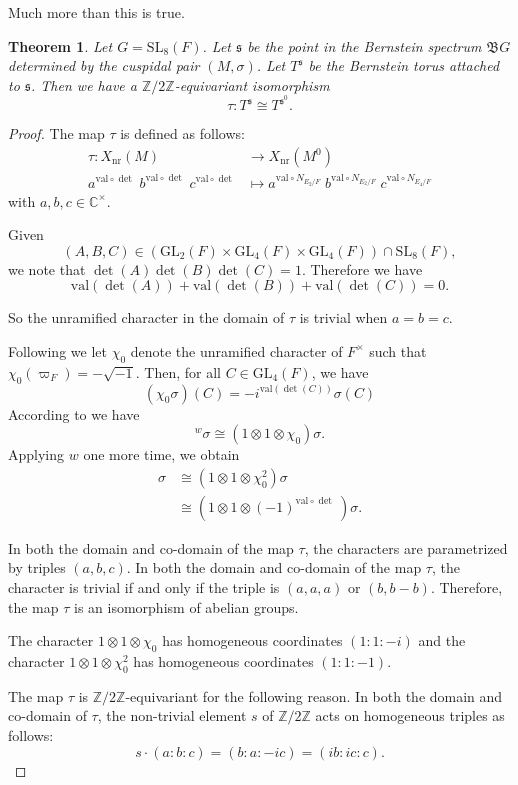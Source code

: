 \documentclass[11pt]{amsart}
\newtheorem{theorem}{Theorem}[section]
\theoremstyle{remark}
\theoremstyle{definition}
\def\fB{\mathfrak{B}}
\newcommand{\Z}{\mathbb{Z}}
\newcommand{\C}{\mathbb{C}}
\newcommand{\SL}{\mathrm{SL}}
\newcommand{\GL}{\mathrm{GL}}
\newcommand{\nr}{\mathrm{nr}}
\def\val{\mathrm{val}}
\newcommand{\fs}{\mathfrak{s}}
\def\fB{\mathfrak{B}}
\begin{document}
Much more than this is true.

\begin{theorem}  Let $G = \SL_8(F)$.  Let $\fs$ be the point in the Bernstein spectrum $\fB G$ determined by the cuspidal pair $(M,\sigma)$.   
  Let $T^{\fs}$ be the Bernstein torus attached to  $\fs$.   Then we have a $\Z/2\Z$-equivariant isomorphism
\[
 \tau :  T^{\fs} \cong T^{\fs^0}.   
\]
\end{theorem}
\begin{proof}   The map $\tau$ is defined as follows:
\begin{align*} 
\tau : X_{\nr}(M) & \longrightarrow X_{\nr}(M^0) \\
a^{\val \circ \det}\;b^{\val \circ \det}\;c^{\val \circ \det} & \mapsto a^{\val \circ N_{E_2/F}}\; b^{\val \circ N_{E_2/F}}\; c^{\val \circ N_{E_4/F}}
\end{align*}
with $a,b,c  \in \C^\times$.

Given 
\[
(A, B, C) \in (\GL_2(F) \times  \GL_4(F) \times \GL_4(F)) \cap \SL_8(F), 
\]
we note that $\det(A) \det(B) \det(C) = 1$.   Therefore we have
\[
\val(\det(A)) + \val(\det(B)) + \val(\det(C)) = 0.
\]

So the unramified character in the domain of $\tau$ is trivial when $a = b = c$.   

Following \cite[\S4.1]{R} we let $\chi_0$ denote the unramified character of $F^\times$ such that $\chi_0(\varpi_F) = - \sqrt{-1}$.   Then, for all $C \in \GL_4(F)$, we have
\[
(\chi_0 \sigma) (C) = -i ^{\val(\det(C))} \sigma(C)
\]
According to \cite[\S4.2]{R} we have
\[
{}^w \sigma \cong (1 \otimes 1 \otimes \chi_0) \sigma.
\]
Applying $w$ one more time, we obtain
\begin{align*}
\sigma & \cong (1 \otimes 1 \otimes \chi_0^2) \sigma   \\
& \cong (1 \otimes 1 \otimes (-1)^{\val \circ \det}\,)\sigma.
\end{align*}



In both the domain and co-domain of the map $\tau$, the characters are parametrized by triples $(a,b,c)$.   In both the domain and co-domain of the map $\tau$, the character is trivial if and only if 
the triple is $(a,a,a)$ or $(b,b-b)$.   Therefore, the map $\tau$ is an isomorphism of abelian groups.   

The character $1 \otimes 1 \otimes \chi_0$ has homogeneous coordinates $(1 : 1 : -i)$ and the character $1 \otimes 1 \otimes \chi_0^2$ has homogeneous coordinates $(1 : 1 : -1)$.   

The map $\tau$ is $\Z/2\Z$-equivariant for the following reason.   In both the domain and co-domain of $\tau$, the non-trivial element $s$ of $\Z/2\Z$ acts on homogeneous triples as follows:
\[
s \cdot (a:b:c) =  (b:a: -ic) = (ib: ic : c).
\]
\end{proof}
\end{document}
